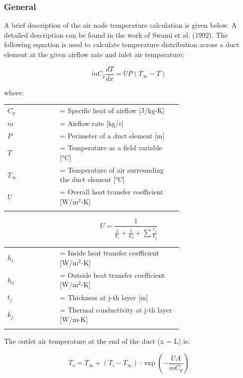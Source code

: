 \subsubsection{General}

A brief description of the air node temperature calculation is given below. A detailed description can be found in the work of Swami et al. (1992). The following equation is used to calculate temperature distribution across a duct element at the given airflow rate and inlet air temperature:

\begin{equation}
\dot{m} C_p \frac{dT}{dx} = UP(T_\infty  - T)
\end{equation}

where:

\begin{tabular}{lp{0.7\linewidth}}
\\
$C_p$ &= Specific heat of airflow [J/kg-K]\\
$\dot{m}$ &= Airflow rate [kg/s]\\
$P$ &= Perimeter of a duct element [m]\\
$T$ &= Temperature as a field variable [°C]\\
$T_\infty$ &= Temperature of air surrounding the duct element [°C]\\
$U$ &= Overall heat transfer coefficient [W/m\(^{2}\)-K]\\
\\
\end{tabular}

\begin{equation}
U = \frac{1}{{\frac{1}{{{h_i}}} + \frac{1}{{{h_o}}} + \sum {\frac{{{t_j}}}{{{k_j}}}} }}
\end{equation}

\begin{tabular}{lp{0.7\linewidth}}
\\
$h_i$ &= Inside heat transfer coefficient [W/m\(^{2}\)-K]\\
$h_o$ &= Outside heat transfer coefficient [W/m\(^{2}\)-K]\\
$t_j$ &= Thickness at j-th layer [m]\\
$k_j$ &= Thermal conductivity at j-th layer [W/m-K]\\
\\
\end{tabular}

The outlet air temperature at the end of the duct (x = L) is:

\begin{equation}
T_o = T_\infty + (T_i - T_\infty) \cdot \exp \left(- \frac{UA}{\dot{m} C_p} \right)
\end{equation}

